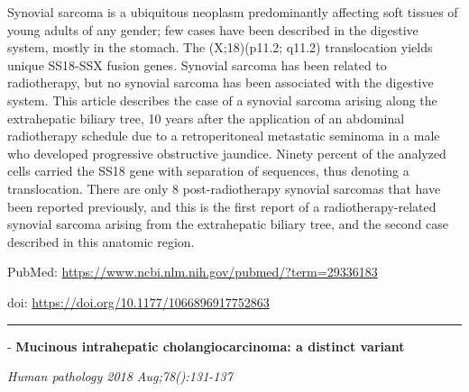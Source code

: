 \documentclass[]{article}
\begin{document}
Synovial sarcoma is a ubiquitous neoplasm predominantly affecting soft
tissues of young adults of any gender; few cases have been described in
the digestive system, mostly in the stomach. The (X;18)(p11.2; q11.2)
translocation yields unique SS18-SSX fusion genes. Synovial sarcoma has
been related to radiotherapy, but no synovial sarcoma has been
associated with the digestive system. This article describes the case of
a synovial sarcoma arising along the extrahepatic biliary tree, 10 years
after the application of an abdominal radiotherapy schedule due to a
retroperitoneal metastatic seminoma in a male who developed progressive
obstructive jaundice. Ninety percent of the analyzed cells carried the
SS18 gene with separation of sequences, thus denoting a translocation.
There are only 8 post-radiotherapy synovial sarcomas that have been
reported previously, and this is the first report of a
radiotherapy-related synovial sarcoma arising from the extrahepatic
biliary tree, and the second case described in this anatomic region.

PubMed: \url{https://www.ncbi.nlm.nih.gov/pubmed/?term=29336183}

doi: \url{https://doi.org/10.1177/1066896917752863}

{}

{}

\begin{center}\rule{0.5\linewidth}{\linethickness}\end{center}

 - \textbf{Mucinous intrahepatic cholangiocarcinoma: a distinct variant}

\emph{Human pathology 2018 Aug;78():131-137}
\end{document}
